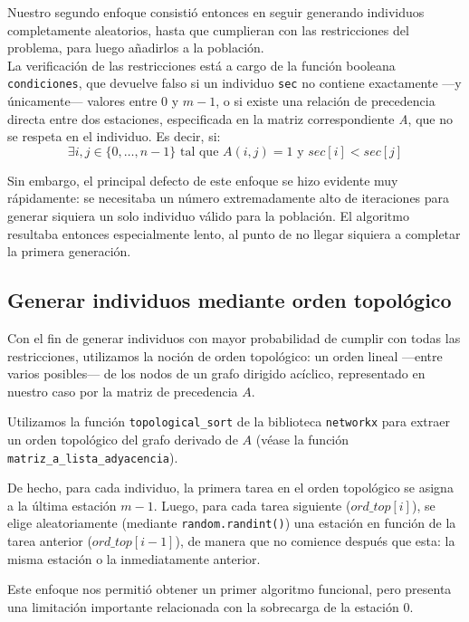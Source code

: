 \documentclass[12pt,a4paper]{report}
\begin{document}
    Nuestro segundo enfoque consistió entonces en seguir generando individuos completamente aleatorios, hasta que cumplieran con las restricciones del problema, para luego añadirlos a la población.\\

    La verificación de las restricciones está a cargo de la función booleana \texttt{condiciones}, que devuelve falso si un individuo \texttt{sec} no contiene exactamente —y únicamente— valores entre $0$ y $m-1$, o si existe una relación de precedencia directa entre dos estaciones, especificada en la matriz correspondiente \textit{A}, que no se respeta en el individuo. Es decir, si:
    \[
    \exists i,j \in \{0,\dots,n-1\} \text{ tal que } A(i,j) = 1 \text{ y } sec[i] < sec[j]
    \]

    Sin embargo, el principal defecto de este enfoque se hizo evidente muy rápidamente: se necesitaba un número extremadamente alto de iteraciones para generar siquiera un solo individuo válido para la población.
    El algoritmo resultaba entonces especialmente lento, al punto de no llegar siquiera a completar la primera generación.

    \subsection*{Generar individuos mediante orden topológico}

    Con el fin de generar individuos con mayor probabilidad de cumplir con todas las restricciones, utilizamos la noción de orden topológico: un orden lineal —entre varios posibles— de los nodos de un grafo dirigido acíclico, representado en nuestro caso por la matriz de precedencia $A$. 

    Utilizamos la función \texttt{topological\_sort} de la biblioteca \texttt{networkx} para extraer un orden topológico del grafo derivado de $A$ (véase la función \texttt{matriz\_a\_lista\_adyacencia}).

    De hecho, para cada individuo, la primera tarea en el orden topológico se asigna a la última estación $m-1$. Luego, para cada tarea siguiente ($ord\_top[i]$), se elige aleatoriamente (mediante \texttt{random.randint()}) una estación en función de la tarea anterior ($ord\_top[i-1]$), de manera que no comience después que esta: la misma estación o la inmediatamente anterior.

    Este enfoque nos permitió obtener un primer algoritmo funcional, pero presenta una limitación importante relacionada con la sobrecarga de la estación $0$.
\end{document}
